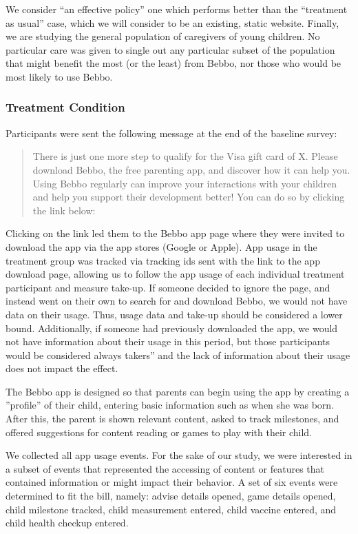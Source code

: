 \documentclass{article}
\begin{document}
We consider “an effective policy” one which performs better than the “treatment as usual” case, which we will consider to be an existing, static website. Finally, we are studying the general population of caregivers of young children. No particular care was given to single out any particular subset of the population that might benefit the most (or the least) from Bebbo, nor those who would be most likely to use Bebbo.




\subsubsection*{Treatment Condition}
Participants were sent the following message at the end of the baseline survey:

\begin{quote}
There is just one more step to qualify for the Visa gift card of X. Please download Bebbo, the free parenting app, and discover how it can help you. Using Bebbo regularly can improve your interactions with your children and help you support their development better! You can do so by clicking the link below:
\end{quote}

Clicking on the link led them to the Bebbo app page where they were invited to download the app via the app stores (Google or Apple). App usage in the treatment group was tracked via tracking ids sent with the link to the app download page, allowing us to follow the app usage of each individual treatment participant and measure take-up. If someone decided to ignore the page, and instead went on their own to search for and download Bebbo, we would not have data on their usage. Thus, usage data and take-up should be considered a lower bound. Additionally, if someone had previously downloaded the app, we would not have information about their usage in this period, but those participants would be considered always takers” and the lack of information about their usage does not impact the effect.

The Bebbo app is designed so that parents can begin using the app by creating a ”profile” of their child, entering basic information such as when she was born. After this, the parent is shown relevant content, asked to track milestones, and offered suggestions for content reading or games to play with their child.

We collected all app usage events. For the sake of our study, we were interested in a subset of events that represented the accessing of content or features that contained information or might impact their behavior. A set of six events were determined to fit the bill, namely: advise details opened, game details opened, child milestone tracked, child measurement entered, child vaccine entered, and child health checkup entered.
\end{document}
